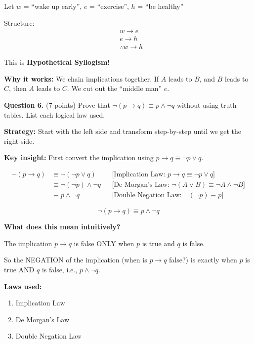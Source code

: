 \documentclass[11pt,a4paper]{article}
\begin{document}
\begin{solnbox}
Let $w$ = ``wake up early'', $e$ = ``exercise'', $h$ = ``be healthy''

Structure:
\begin{align*}
&w \to e \\
&e \to h \\
&\therefore w \to h
\end{align*}

This is \textbf{Hypothetical Syllogism}!

\textbf{Why it works:} We chain implications together. If $A$ leads to $B$, and $B$ leads to $C$, then $A$ leads to $C$. We cut out the ``middle man'' $e$.
\end{solnbox}

\vspace{15pt}

\textbf{Question 6.} (7 points) Prove that $\neg(p \to q) \equiv p \land \neg q$ without using truth tables. List each logical law used.

\begin{solnbox}
\textbf{Strategy:} Start with the left side and transform step-by-step until we get the right side.

\textbf{Key insight:} First convert the implication using $p \to q \equiv \neg p \lor q$.

\begin{align*}
\neg(p \to q) &\equiv \neg(\neg p \lor q) && \text{[Implication Law: } p \to q \equiv \neg p \lor q \text{]} \\
&\equiv \neg(\neg p) \land \neg q && \text{[De Morgan's Law: } \neg(A \lor B) \equiv \neg A \land \neg B \text{]} \\
&\equiv p \land \neg q && \text{[Double Negation Law: } \neg(\neg p) \equiv p \text{]}
\end{align*}

$$\boxed{\neg(p \to q) \equiv p \land \neg q}$$

\textbf{What does this mean intuitively?}

The implication $p \to q$ is false ONLY when $p$ is true and $q$ is false.

So the NEGATION of the implication (when is $p \to q$ false?) is exactly when $p$ is true AND $q$ is false, i.e., $p \land \neg q$.

\textbf{Laws used:}
\begin{enumerate}[noitemsep]
    \item Implication Law
    \item De Morgan's Law
    \item Double Negation Law
\end{enumerate}
\end{solnbox}
\end{document}
